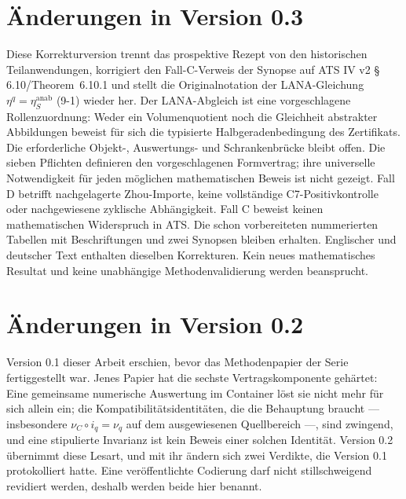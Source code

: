 \documentclass[11pt,a4paper]{article}
\theoremstyle{definition}
\begin{document}
\clearpage
\tableofcontents
\clearpage

\section*{Änderungen in Version 0.3}
\label{sec:changes03}

Diese Korrekturversion trennt das prospektive Rezept von den historischen
Teilanwendungen, korrigiert den Fall-C-Verweis der Synopse auf ATS IV v2
\S\,6.10/Theorem~6.10.1 und stellt die Originalnotation der LANA-Gleichung
$\eta^q=\eta_S^{\mathrm{anab}}$ (9-1) wieder her.
Der LANA-Abgleich ist eine vorgeschlagene Rollenzuordnung: Weder ein
Volumenquotient noch die Gleichheit abstrakter Abbildungen beweist für sich
die typisierte Halbgeradenbedingung des Zertifikats. Die erforderliche
Objekt-, Auswertungs- und Schrankenbrücke bleibt offen.
Die sieben Pflichten definieren den vorgeschlagenen Formvertrag; ihre
universelle Notwendigkeit für jeden möglichen mathematischen Beweis ist
nicht gezeigt. Fall D betrifft nachgelagerte Zhou-Importe, keine vollständige
C7-Positivkontrolle oder nachgewiesene zyklische Abhängigkeit. Fall C beweist
keinen mathematischen Widerspruch in ATS.
Die schon vorbereiteten nummerierten Tabellen mit Beschriftungen und zwei
Synopsen bleiben erhalten. Englischer und deutscher Text enthalten dieselben
Korrekturen. Kein neues mathematisches Resultat und keine unabhängige
Methodenvalidierung werden beansprucht.

\medskip

\section*{Änderungen in Version 0.2}
\label{sec:changes02}

Version 0.1 dieser Arbeit erschien, bevor das Methodenpapier der
Serie~\cite{GeigerBCM2026} fertiggestellt war. Jenes Papier hat die sechste
Vertragskomponente gehärtet: Eine gemeinsame numerische Auswertung im Container
löst sie nicht mehr für sich allein ein; die Kompatibilitätsidentitäten, die die
Behauptung braucht --- insbesondere $\nu_C \circ i_q = \nu_q$ auf dem
ausgewiesenen Quellbereich ---, sind zwingend, und eine stipulierte Invarianz ist
kein Beweis einer solchen Identität. Version 0.2 übernimmt diese Lesart, und mit
ihr ändern sich zwei Verdikte, die Version 0.1 protokolliert hatte. Eine
veröffentlichte Codierung darf nicht stillschweigend revidiert werden, deshalb
werden beide hier benannt.
\end{document}
